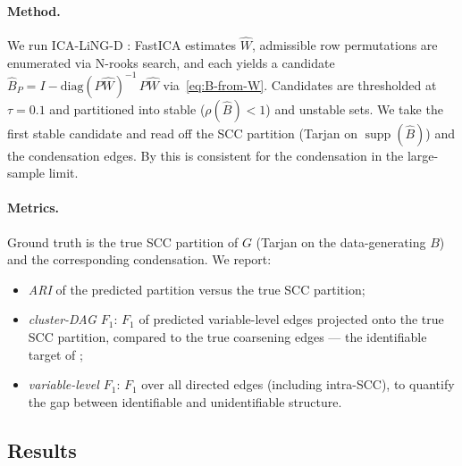 \documentclass{article}
\begin{document}
\paragraph{Method.} We run ICA-LiNG-D \citep{lacerda2008discovering}: FastICA estimates $\hat W$, admissible row permutations are enumerated via N-rooks search, and each yields a candidate $\hat B_P = I - \mathrm{diag}(P\hat W)^{-1}\, P\hat W$ via~\eqref{eq:B-from-W}. Candidates are thresholded at $\tau = 0.1$ and partitioned into stable ($\rho(\hat B) < 1$) and unstable sets. We take the first stable candidate and read off the SCC partition (Tarjan on $\operatorname{supp}(\hat B)$) and the condensation edges. By  this is consistent for the condensation in the large-sample limit.

\paragraph{Metrics.} Ground truth is the true SCC partition of $G$ (Tarjan on the data-generating $B$) and the corresponding condensation. We report:
\begin{itemize}
    \item \emph{ARI} of the predicted partition versus the true SCC partition;
    \item \emph{cluster-DAG $F_1$}: $F_1$ of predicted variable-level edges projected onto the true SCC partition, compared to the true coarsening edges --- the identifiable target of ;
    \item \emph{variable-level $F_1$}: $F_1$ over all directed edges (including intra-SCC), to quantify the gap between identifiable and unidentifiable structure.
\end{itemize}

\subsection{Results}
\end{document}
